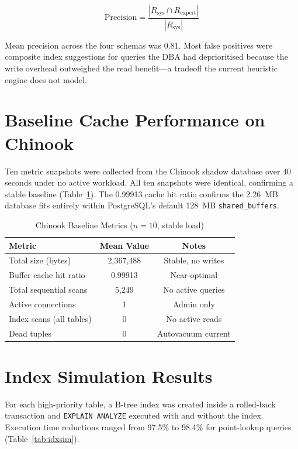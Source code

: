 \documentclass[12pt,a4paper]{report}
\begin{document}
\begin{equation}
    \text{Precision} = \frac{|R_{\text{sys}} \cap R_{\text{expert}}|}{|R_{\text{sys}}|}
\end{equation}

Mean precision across the four schemas was 0.81. Most false positives were composite index suggestions for queries the DBA had deprioritised because the write overhead outweighed the read benefit---a tradeoff the current heuristic engine does not model.

\section{Baseline Cache Performance on Chinook}

Ten metric snapshots were collected from the Chinook shadow database over 40 seconds under no active workload. All ten snapshots were identical, confirming a stable baseline (Table~\ref{tab:baseline}). The 0.99913 cache hit ratio confirms the 2.26~MB database fits entirely within PostgreSQL's default 128~MB \texttt{shared\_buffers}.

\begin{table}[htbp]
\caption{Chinook Baseline Metrics ($n=10$, stable load)}
\label{tab:baseline}
\centering
\begin{tabular}{lcc}
\toprule
\textbf{Metric} & \textbf{Mean Value} & \textbf{Notes} \\
\midrule
Total size (bytes)      & 2,367,488 & Stable, no writes \\
Buffer cache hit ratio  & 0.99913   & Near-optimal \\
Total sequential scans  & 5,249     & No active queries \\
Active connections      & 1         & Admin only \\
Index scans (all tables) & 0        & No active reads \\
Dead tuples             & 0         & Autovacuum current \\
\bottomrule
\end{tabular}
\end{table}

\section{Index Simulation Results}

For each high-priority table, a B-tree index was created inside a rolled-back transaction and \texttt{EXPLAIN ANALYZE} executed with and without the index. Execution time reductions ranged from 97.5\% to 98.4\% for point-lookup queries (Table~\ref{tab:idxsim}).
\end{document}
